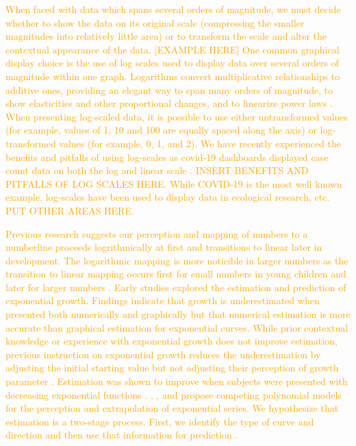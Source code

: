 \documentclass[]{interact}
\theoremstyle{plain}%
\theoremstyle{definition}
\theoremstyle{remark}
\begin{document}
\textcolor{Orange}{
When faced with data which spans several orders of magnitude, we must decide whether to show the data on its original scale (compressing the smaller magnitudes into relatively little area) or to transform the scale and alter the contextual appearance of the data. [EXAMPLE HERE]
One common graphical display choice is the use of log scales used to display data over several orders of magnitude within one graph. 
Logarithms convert multiplicative relationships to additive ones, providing an elegant way to span many orders of magnitude, to show elasticities and other proportional changes, and to linearize power laws \citep{menge_logarithmic_2018}. 
When presenting log-scaled data, it is possible to use either untransformed values (for example, values of 1, 10 and 100 are equally spaced along the axis) or log-transformed values (for example, 0, 1, and 2). 
We have recently experienced the benefits and pitfalls of using log-scales as covid-19 dashboards displayed case count data on both the log and linear scale \citep{wade_fagen_ulmschneider_2020}. 
INSERT BENEFITS AND PITFALLS OF LOG SCALES HERE. 
While COVID-19 is the most well known example, log-scales have been used to display data in ecological research, etc. 
PUT OTHER AREAS HERE.
}

\textcolor{Orange}{
Previous research suggests our perception and mapping of numbers to a numberline proceeds logrithmically at first and transitions to linear later in development. 
The logarithmic mapping is more noticible in larger numbers as the transition to linear mapping occurs first for small numbers in young children and later for larger numbers \citep{varshney_why_2013, siegler_numerical_2017, dehaeneLogLinearDistinct2008}.
Early studies explored the estimation and prediction of exponential growth. 
Findings indicate that growth is underestimated when presented both numerically and graphically but that numerical estimation is more accurate than graphical estimation for exponential curves. 
While prior contextual knowledge or experience with exponential growth does not improve estimation, previous instruction on exponential growth reduces the underestimation by adjusting the initial starting value but not adjusting their perception of growth parameter
\citep{wagenaar_misperception_1975, jones_polynomial_1977}.
Estimation was shown to improve when subjects were presented with decreasing exponential functions \citep{timmers_inverse_1977}.
\cite{jones_polynomial_1977}, \cite{wagenaar_extrapolation_1978}, and \cite{jones_generalized_1979} propose competing polynomial models for the perception and extrapolation of exponential series.
We hypothesize that estimation is a two-stage process. First, we identify the type of curve and direction and then use that information for prediction \citep{best_perception_2007}.
}
\end{document}
